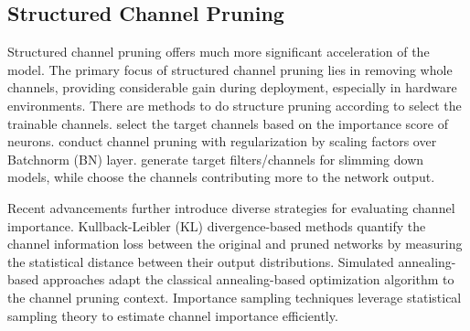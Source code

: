 \subsection{Structured Channel Pruning} 
Structured channel pruning offers much more significant acceleration of the model. The primary focus of structured channel pruning lies in removing whole channels, providing considerable gain during deployment, especially in hardware environments. 
There are methods to do structure pruning according to select the trainable channels. \cite{Luo2018AutoPrunerAE} select the target channels based on the importance score of neurons. \cite{liu2017learning} conduct channel pruning with regularization by scaling factors over Batchnorm (BN) layer. \cite{Ding2019CentripetalSF} generate target filters/channels for slimming down models, while \cite{Zhang2021CarryingOC} choose the channels contributing more to the network output. 

Recent advancements further introduce diverse strategies for evaluating channel importance. 
Kullback-Leibler (KL) divergence-based methods \cite{Luo2019NeuralNP} quantify the channel information loss between the original and pruned networks by measuring the statistical distance between their output distributions.
Simulated annealing-based approaches \cite{Nayman2019XNASNA} adapt the classical annealing-based optimization algorithm to the channel pruning context. Importance sampling techniques \cite{Baykal2019SiPPingNN} leverage statistical sampling theory to estimate channel importance efficiently.



